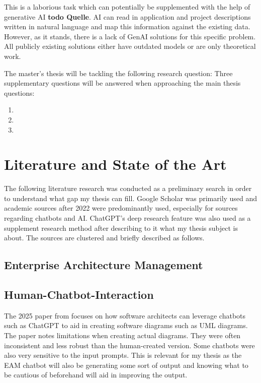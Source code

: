 \documentclass[english]{lni}
\begin{document}
This is a laborious task which can potentially be supplemented with the help of generative AI \textbf{todo Quelle}. AI can read in application and project descriptions written in natural language and map this information against the existing data. However, as it stands, there is a lack of GenAI solutions for this specific problem. All publicly existing solutions either have outdated models or are only theoretical work.

The master's thesis will be tackling the following research question:  Three supplementary questions will be answered when approaching the main thesis questions:
\begin{enumerate}
    \item {}
    \item {}
    \item {}
\end{enumerate}


\section{Literature and State of the Art}
The following literature research was conducted as a preliminary search in order to understand what gap my thesis can fill. Google Scholar was primarily used and academic sources after 2022 were predominantly used, especially for sources regarding chatbots and AI. ChatGPT's deep research feature was also used as a supplement research method after describing to it what my thesis subject is about. The sources are clustered and briefly described as follows.

\subsection{Enterprise Architecture Management}

\subsection{Human-Chatbot-Interaction}
The 2025 paper from \cite{ramachandran2025transforming} focuses on how software architects can leverage chatbots such as ChatGPT to aid in creating software diagrams such as UML diagrams. The paper notes limitations when creating actual diagrams. They were often inconsistent and less robust than the human-created version. Some chatbots were also very sensitive to the input prompts. This is relevant for my thesis as the EAM chatbot will also be generating some sort of output and knowing what to be cautious of beforehand will aid in improving the output.
\end{document}
